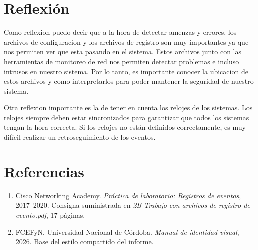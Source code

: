 \documentclass[12pt,a4paper]{article}
\begin{document}
\section{Reflexión}
Como reflexion puedo decir que a la hora de detectar amenzas y errores,
los archivos de configuracion y los archivos de registro son muy importantes ya que nos permiten ver que esta pasando en el sistema.
Estos archivos junto con las herramientas de monitoreo de red nos permiten detectar problemas e incluso intrusos
en nuestro sistema. Por lo tanto, es importante conocer la ubicacion de estos archivos y como interpretarlos para poder mantener la seguridad de nuestro sistema.

Otra reflexion importante es la de tener en cuenta los relojes de los sistemas. Los relojes siempre deben estar sincronizados para garantizar que todos los sistemas tengan la hora
correcta. Si los relojes no están definidos correctamente, es muy difícil realizar un retroseguimiento de los
eventos.

\newpage
\section{Referencias}
\begin{enumerate}
    \item Cisco Networking Academy. \textit{Práctica de laboratorio:
    Registros de eventos}, 2017--2020. Consigna suministrada en
    \textit{2B Trabajo con archivos de registro de evento.pdf}, 17 páginas.
    \item FCEFyN, Universidad Nacional de Córdoba. \textit{Manual de
    identidad visual}, 2026. Base del estilo compartido del informe.
\end{enumerate}
\end{document}
